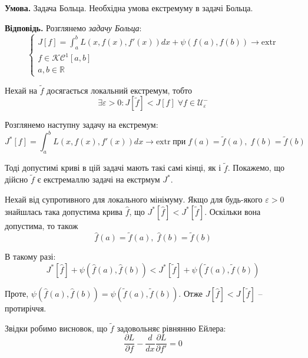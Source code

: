 \documentclass[14pt]{extarticle}
\newcommand{\<}{\langle}
\renewcommand{\>}{\rangle}
\theoremstyle{mystyle}{\newtheorem{definition}{Definition}[section]}
\theoremstyle{mystyle}{\newtheorem{proposition}[definition]{Proposition}}
\theoremstyle{mystyle}{\newtheorem{theorem}[definition]{Theorem}}
\theoremstyle{mystyle}{\newtheorem{lemma}[definition]{Lemma}}
\theoremstyle{mystyle}{\newtheorem{corollary}[definition]{Corollary}}
\theoremstyle{mystyle}{\newtheorem*{remark}{Remark}}
\theoremstyle{mystyle}{\newtheorem*{remarks}{Remarks}}
\theoremstyle{mystyle}{\newtheorem*{example}{Example}}
\theoremstyle{mystyle}{\newtheorem*{examples}{Examples}}
\theoremstyle{definition}{\newtheorem*{exercise}{Exercise}}
\theoremstyle{cstyle}{\newtheorem*{cthm}{}}
\theoremstyle{warn}
\begin{document}
\textbf{Умова.} Задача Больца. Необхідна умова екстремуму в задачі Больца.

\textbf{Відповідь.} Розглянемо \textit{задачу Больца}:
\begin{equation}
    \begin{cases}
        J[f] = \int_a^b L(x,f(x),f'(x))dx + \psi(f(a), f(b)) \to \text{extr} \\
        f \in \mathcal{KC}^1[a,b] \\
        a,b \in \mathbb{R}
    \end{cases}
\end{equation}

Нехай на $\widetilde{f}$ досягається локальний екстремум, тобто
\begin{equation}
    \exists \varepsilon > 0: J[\widetilde{f}] < J[f] \; \forall f \in \mathcal{U}_{\varepsilon}^{-}
\end{equation}

Розглянемо наступну задачу на екстремум:
\begin{equation}
    J^*[f] = \int_a^b L(x,f(x),f'(x))dx \to \text{extr} \; \text{при} \; f(a)=\widetilde{f}(a), \; f(b)=\widetilde{f}(b)
\end{equation}

Тоді допустимі криві в цій задачі мають такі самі кінці, як і $\widetilde{f}$. Покажемо, що 
дійсно $\widetilde{f}$ є екстремаллю задачі на екстрмум $J^*$. 

Нехай від супротивного для локального мінімуму. Якщо для будь-якого $\varepsilon>0$ знайшлась
така допустима крива $\hat{f}$, що $J^*[\hat{f}] < J^*[\widetilde{f}]$. Оскільки вона допустима, то також
\begin{equation}
    \hat{f}(a) = \widetilde{f}(a), \; \hat{f}(b) = \widetilde{f}(b)
\end{equation}

В такому разі:
\begin{equation}
    J^*[\hat{f}] + \psi(\hat{f}(a),\hat{f}(b)) < J^*[\widetilde{f}] + \psi(\widetilde{f}(a),\widetilde{f}(b))
\end{equation}

Проте, $\psi(\hat{f}(a),\hat{f}(b))=\psi(\widetilde{f}(a), \widetilde{f}(b))$. Отже $J[\hat{f}]<J[\widetilde{f}]$ -- протиріччя.

Звідки робимо висновок, що $\widetilde{f}$ задовольняє рівнянню Ейлера:
\begin{equation}
    \frac{\partial L}{\partial f} - \frac{d}{dx}\frac{\partial L}{\partial f'} = 0
\end{equation}
\end{document}
